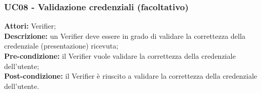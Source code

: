\subsubsection{UC08 - Validazione credenziali (facoltativo)}
\textbf{Attori:} Verifier;\\
\textbf{Descrizione:} un Verifier deve essere in grado di validare la correttezza della credenziale (presentazione) ricevuta;\\
\textbf{Pre-condizione:} il Verifier vuole validare la correttezza della credenziale dell’utente;\\
\textbf{Post-condizione:} il Verifier è riuscito a validare la correttezza della credenziale dell’utente.